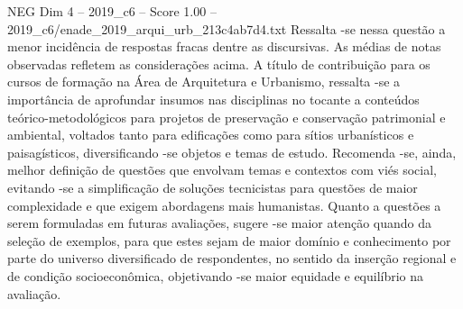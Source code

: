 \begin{textsample}{NEG Dim 4 – 2019\_c6 – Score 1.00 – 2019\_c6/enade\_2019\_arqui\_urb\_213c4ab7d4.txt}
Ressalta -se nessa questão a menor incidência de respostas fracas dentre as discursivas.
As médias de notas observadas refletem as considerações acima.
A título de contribuição para os cursos de formação na Área de Arquitetura e Urbanismo, ressalta -se a importância de aprofundar insumos nas disciplinas no tocante a conteúdos teórico-metodológicos para projetos de preservação e conservação patrimonial e ambiental, voltados tanto para edificações como para sítios urbanísticos e paisagísticos, diversificando -se objetos e temas de estudo.
Recomenda -se, ainda, melhor definição de questões que envolvam temas e contextos com viés social, evitando -se a simplificação de soluções tecnicistas para questões de maior complexidade e que exigem abordagens mais humanistas.
Quanto a questões a serem formuladas em futuras avaliações, sugere -se maior atenção quando da seleção de exemplos, para que estes sejam de maior domínio e conhecimento por parte do universo diversificado de respondentes, no sentido da inserção regional e de condição socioeconômica, objetivando -se maior equidade e equilíbrio na avaliação.

\end{textsample}
